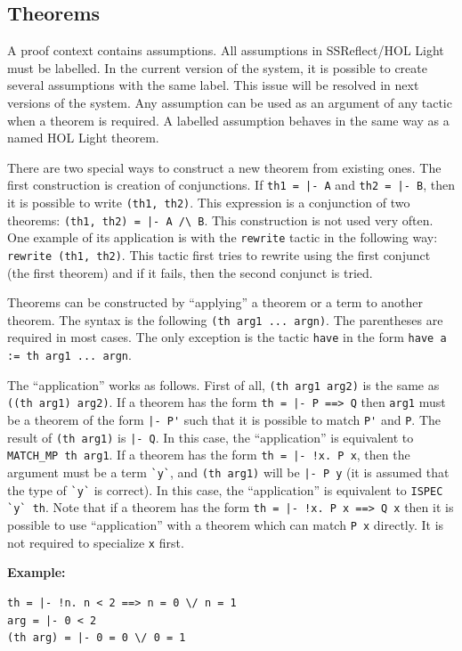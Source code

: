 \documentclass[a4paper]{article}
\begin{document}
\subsection{Theorems}
A proof context contains assumptions. All assumptions in SSReflect/HOL Light must be labelled. In the current version of the system, it is possible to create several assumptions with the same label. This issue will be resolved in next versions of the system. Any assumption can be used as an argument of any tactic when a theorem is required. A labelled assumption behaves in the same way as a named HOL Light theorem.

There are two special ways to construct a new theorem from existing ones. The first construction is creation of conjunctions. If \verb$th1 = |- A$ and \verb$th2 = |- B$, then it is possible to write \verb|(th1, th2)|. This expression is a conjunction of two theorems: \verb$(th1, th2) = |- A /\ B$. This construction is not used very often. One example of its application is with the \verb|rewrite| tactic in the following way: \verb|rewrite (th1, th2)|. This tactic first tries to rewrite using the first conjunct (the first theorem) and if it fails, then the second conjunct is tried.

Theorems can be constructed by ``applying'' a theorem or a term to another theorem. The syntax is the following \verb|(th arg1 ... argn)|. The parentheses are required in most cases. The only exception is the tactic \verb|have| in the form \verb|have a := th arg1 ... argn|.

The ``application'' works as follows. First of all, \verb|(th arg1 arg2)| is the same as \verb|((th arg1) arg2)|. If a theorem has the form \verb$th = |- P ==> Q$ then \verb|arg1| must be a theorem of the form \verb$|- P'$ such that it is possible to match \verb|P'| and \verb|P|. The result of \verb|(th arg1)| is \verb$|- Q$. In this case, the ``application'' is equivalent to \verb|MATCH_MP th arg1|. If a theorem has the form \verb$th = |- !x. P x$, then the argument must be a term \verb|`y`|, and \verb|(th arg1)| will be \verb$|- P y$ (it is assumed that the type of \verb|`y`| is correct). In this case, the ``application'' is equivalent to \verb|ISPEC `y` th|. Note that if a theorem has the form \verb$th = |- !x. P x ==> Q x$ then it is possible to use ``application'' with a theorem which can match \verb|P x| directly. It is not required to specialize \verb|x| first. 

{\bf Example:}
\begin{verbatim}
th = |- !n. n < 2 ==> n = 0 \/ n = 1
arg = |- 0 < 2
(th arg) = |- 0 = 0 \/ 0 = 1
\end{verbatim}
\end{document}
